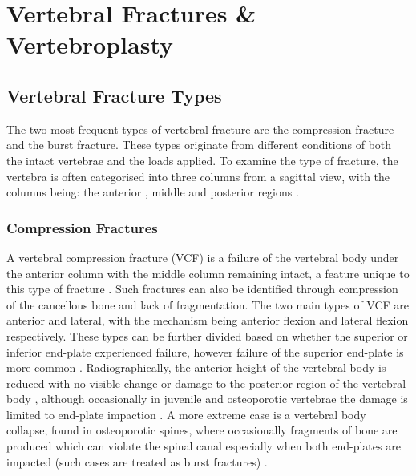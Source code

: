 \section{Vertebral Fractures \&
Vertebroplasty}\label{vertebral-fractures-vertebroplasty}

\subsection{Vertebral Fracture Types}\label{vertebral-fracture-types}

The two most frequent types of vertebral fracture are the compression
fracture and the burst fracture. These types originate from different
conditions of both the intact vertebrae and the loads applied. To
examine the type of fracture, the vertebra is often categorised into
three columns from a sagittal view, with the columns being: the anterior
, middle and posterior regions \cite{Denis1983}.

\subsubsection{Compression Fractures}\label{compression-fractures}

A vertebral compression fracture (VCF) is a failure of the vertebral
body under the anterior column with the middle column remaining intact,
a feature unique to this type of fracture \cite{Denis1983}. Such fractures can
also be identified through compression of the cancellous bone and lack
of fragmentation. The two main types of VCF are anterior and lateral,
with the mechanism being anterior flexion and lateral flexion
respectively. These types can be further divided based on whether the
superior or inferior end-plate experienced failure, however failure of
the superior end-plate is more common \cite{Denis1983}. Radiographically, the
anterior
height of the vertebral body is reduced with no visible change or damage
to the posterior region of the vertebral body \cite{Denis1983}, although
occasionally in juvenile and osteoporotic vertebrae the damage is
limited to end-plate impaction \cite{Magerl1994}. A more extreme case
is a
vertebral body collapse, found in osteoporotic spines, where
occasionally fragments of bone are produced which can violate the spinal
canal especially when both end-plates are impacted (such cases are
treated as burst fractures) \cite{Magerl1994}.

